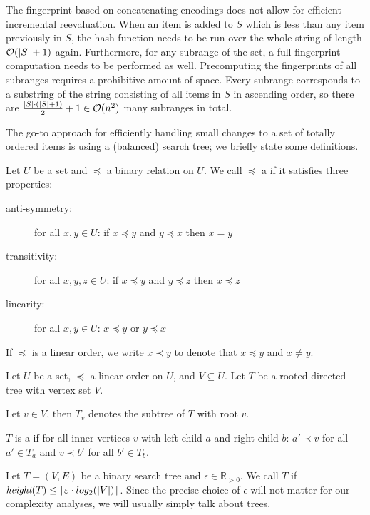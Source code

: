 The fingerprint based on concatenating encodings does not allow for efficient incremental reevaluation. When an item is added to $S$ which is less than any item previously in $S$, the hash function needs to be run over the whole string of length $\complexity{\abs{S} + 1}$ again. Furthermore, for any subrange of the set, a full fingerprint computation needs to be performed as well. Precomputing the fingerprints of all subranges requires a prohibitive amount of space. Every subrange corresponds to a substring of the string consisting of all items in $S$ in ascending order, so there are $\frac{\abs{S} \cdot (\abs{S} + 1)}{2} + 1 \in \complexity{n^2}$ many subranges in total.

The go-to approach for efficiently handling small changes to a set of totally ordered items is using a (balanced) search tree; we briefly state some definitions.

\begin{definition}
Let $U$ be a set and $\preceq$ a binary relation on $U$.
We call $\preceq$ a  if it satisfies three properties:

  \begin{description}
    \item[anti-symmetry:] for all $x, y \in U$: if $x \preceq y$ and $y \preceq x$ then $x = y$
    \item[transitivity:] for all $x, y, z \in U$: if $x \preceq y$ and $y \preceq z$ then $x \preceq z$
    \item[linearity:] for all $x, y \in U$: $x \preceq y$ or $y \preceq x$
  \end{description}

If $\preceq$ is a linear order, we write $x \prec y$ to denote that $x \preceq y$ and $x \neq y$.
\end{definition}

\begin{definition}
Let $U$ be a set, $\preceq$ a linear order on $U$, and $V \subseteq U$. Let $T$ be a rooted directed tree with vertex set $V$.

Let $v \in V$, then $T_v$ denotes the subtree of $T$ with root $v$.

$T$ is a  if for all inner vertices $v$ with left child $a$ and right child $b$: $a' \prec v$ for all $a' \in T_a$ and $v \prec b'$ for all $b' \in T_b$.

\end{definition}

\begin{definition}
Let $T = (V, E)$ be a binary search tree and $\epsilon \in \mathbb{R}_{> 0}$.
We call $T$  if $\textit{height}(T) \leq \ceil*{\epsilon \cdot log_2(|V|)}$.
Since the precise choice of $\epsilon$ will not matter for our complexity analyses, we will usually simply talk about  trees.
\end{definition}

